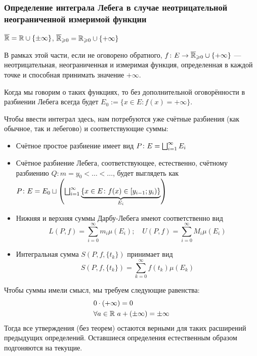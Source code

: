 \subsubsection*{Определение интеграла Лебега в случае неотрицательной неограниченной измеримой функции}

\begin{designation}
	$\overline{\mathbb{R}} = \mathbb{R} \cup \{\pm\infty\}$, $\overline{\mathbb{R}}_{\geqslant 0} = \mathbb{R}_{\geqslant 0} \cup \{+\infty\}$
\end{designation}

\begin{note}
	В рамках этой части, если не оговорено обратного, $f \colon E \to \overline{\mathbb{R}}_{\geqslant 0} \cup \{+\infty\}$ --- неотрицательная, неограниченная и измеримая функция, определенная в каждой точке и способная принимать значение $+\infty$.
\end{note}

\begin{designation}
	Когда мы говорим о таких функциях, то без дополнительной оговорённости в разбиении Лебега всегда будет $E_0 := \{x \in E \colon f(x) = +\infty\}$.
\end{designation}

\begin{note}
	Чтобы ввести интеграл здесь, нам потребуются уже счётные разбиения (как обычное, так и лебегово) и соответствующие суммы:
	\begin{itemize}
		\item Счётное простое разбиение имеет вид $P \colon E = \bigsqcup_{i = 1}^\infty E_i$
		
		\item Счётное разбиение Лебега, соответствующее, естественно, счётному разбиению $Q \colon m = y_0 < \ldots < \ldots$, будет выглядеть как $P \colon E = E_0 \sqcup \left(\bigsqcup_{i = 1}^\infty \underbrace{\{x \in E \colon f(x) \in \left[y_{i - 1}; y_i\right)\}}_{E_i}\right)$
		
		\item Нижняя и верхняя суммы Дарбу-Лебега имеют соответственно вид
		\[
			L(P, f) = \sum_{i = 0}^\infty m_i \mu(E_i); \quad U(P, f) = \sum_{i = 0}^\infty M_i \mu(E_i)
		\]
		
		\item Интегральная сумма $S(P, f, \{t_k\})$ принимает вид
		\[
			S(P, f, \{t_k\}) = \sum_{k = 0}^\infty f(t_k) \mu(E_k)
		\]
	\end{itemize}
\end{note}

\begin{note}
	Чтобы суммы имели смысл, мы требуем следующие равенства:
	\begin{align*}
		&{0 \cdot (+\infty) = 0}
		\\
		&{\forall a \in \mathbb{R}\ a + (\pm\infty) = \pm\infty}
	\end{align*}
	Тогда все утверждения (без теорем) остаются верными для таких расширений предыдущих определений. Оставшиеся определения естественным образом подгоняются на текущие.
\end{note}

